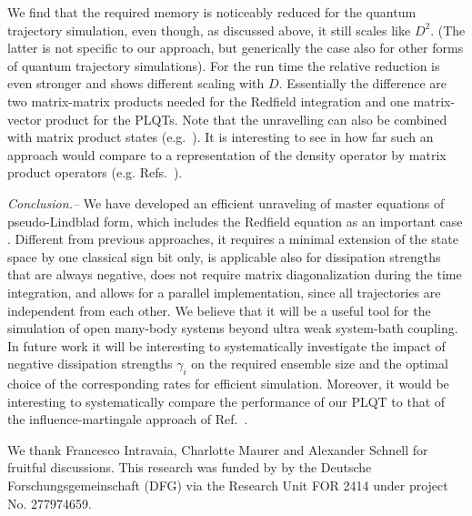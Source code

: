 \documentclass[twocolumn,prl,superscriptaddress]{revtex4-2}
\begin{document}
We find that the required memory is noticeably reduced for the quantum trajectory simulation, even though, as discussed above, it still scales like $D^2$. (The latter is not specific to our approach, but generically the case also for other forms of quantum trajectory simulations). For the run time the relative reduction is even stronger and shows different scaling with $D$. Essentially the difference are two matrix-matrix products needed for the Redfield integration and one matrix-vector product for the PLQTs. 
Note that the unravelling can also be combined with matrix product states (e.g.~\cite{Verstraete_2008,USchollwoeck2011}). It is interesting to see in how far such an approach would compare to a representation of the density operator by matrix product operators (e.g. Refs.~\cite{XXuJThinga2019,Weimer2021}).

\textit{Conclusion.--} We have developed an efficient unraveling of master equations of pseudo-Lindblad form, which includes the Redfield equation as an important case \cite{TBecker2021}. Different from previous approaches, it requires a minimal extension of the state space by one classical sign bit only, is applicable also for dissipation strengths that are always negative, does not require matrix diagonalization during the time integration, and allows for a parallel implementation, since all trajectories are independent from each other. We believe that it will be a useful tool for the simulation of open many-body systems beyond ultra weak system-bath coupling. In future work it will be interesting to systematically investigate the impact of negative dissipation strengths $\gamma_i$ on the required ensemble size and the optimal choice of the corresponding rates for efficient simulation. Moreover, it would be interesting to systematically compare the performance of our PLQT to that of the influence-martingale approach of Ref.~\cite{DonvilMGinanneschi2022}.

\begin{acknowledgments}
	We thank Francesco Intravaia, Charlotte Maurer and Alexander Schnell for fruitful discussions. 
	This research was funded by by the Deutsche Forschungsgemeinschaft (DFG) via the Research Unit FOR 2414 under project No. 277974659.
\end{acknowledgments}


\end{document}
